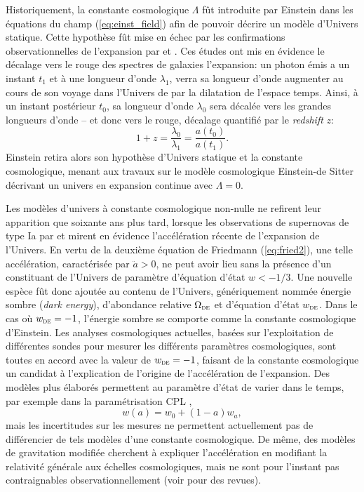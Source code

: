 Historiquement, la constante cosmologique $\Lambda$ fût introduite par Einstein dans les équations du champ (\ref{eq:einst_field}) afin de pouvoir décrire un modèle d'Univers statique.
Cette hypothèse fût mise en échec par les confirmations observationnelles de l'expansion par  et .
Ces études ont mis en évidence le décalage vers le rouge des spectres de galaxies l'expansion: un photon émis a un instant $t_1$ et à une longueur d'onde $\lambda_1$, verra sa longueur d'onde augmenter au cours de son voyage dans l'Univers de par la dilatation de l'espace temps.
Ainsi, à un instant postérieur $t_0$, sa longueur d'onde $\lambda_0$ sera décalée vers les grandes longueurs d'onde -- et donc vers le rouge, décalage quantifié par le \textit{redshift} $z$:
\begin{equation}
    \label{eq:redshift}
    1 + z = \frac{\lambda_0}{\lambda_1} = \frac{a(t_0)}{a(t_1)}.
\end{equation}
Einstein retira alors son hypothèse d'Univers statique et la constante cosmologique, menant aux travaux sur le modèle cosmologique Einstein-de Sitter \cite{einstein_relation_1932} décrivant un univers en expansion continue avec $\Lambda = 0$.

Les modèles d'univers à constante cosmologique non-nulle ne refirent leur apparition que soixante ans plus tard, lorsque les observations de supernovas de type Ia par  et  mirent en évidence l'accélération récente de l'expansion de l'Univers.
En vertu de la deuxième équation de Friedmann (\ref{eq:fried2}), une telle accélération, caractérisée par $\ddot{a} > 0$, ne peut avoir lieu sans la présence d'un constituant de l'Univers de paramètre d'équation d'état $w < -1/3$.
Une nouvelle espèce fût donc ajoutée au contenu de l'Univers, génériquement nommée énergie sombre (\textit{dark energy}), d'abondance relative $\Omega_\textsc{de}$ et d'équation d'état $w_\textsc{de}$.
Dans le cas où $w_\textsc{de} = -1$, l'énergie sombre se comporte comme la constante cosmologique d'Einstein.
Les analyses cosmologiques actuelles, basées sur l'exploitation de différentes sondes pour mesurer les différents paramètres cosmologiques, sont toutes en accord avec la valeur de $w_\textsc{de} = -1$, faisant de la constante cosmologique un candidat à l'explication de l'origine de l'accélération de l'expansion.
Des modèles plus élaborés permettent au paramètre d'état de varier dans le temps, par exemple dans la paramétrisation CPL \cite{chevallier_accelerating_2001,linder_exploring_2003},
\begin{equation}
    \label{eq:de_cpl}
    w(a) = w_0 + (1-a) w_a,
\end{equation}
mais les incertitudes sur les mesures ne permettent actuellement pas de différencier de tels modèles d'une constante cosmologique.
De même, des modèles de gravitation modifiée cherchent à expliquer l'accélération en modifiant la relativité générale aux échelles cosmologiques, mais ne sont pour l'instant pas contraignables observationnellement (voir \cite{clifton_modified_2012,tamosiunas_testing_2020} pour des revues).

